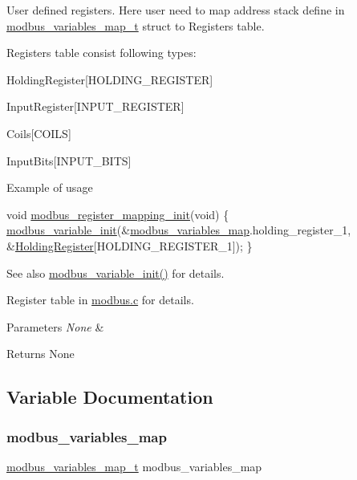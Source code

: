 User defined registers. Here user need to map address stack define in \mbox{\hyperlink{structmodbus__variables__map__t}{modbus\+\_\+variables\+\_\+map\+\_\+t}} struct to Registers table. 

Registers table consist following types\+:
\begin{DoxyItemize}
\item Holding\+Register\mbox{[}H\+O\+L\+D\+I\+N\+G\+\_\+\+R\+E\+G\+I\+S\+T\+ER\mbox{]}
\item Input\+Register\mbox{[}I\+N\+P\+U\+T\+\_\+\+R\+E\+G\+I\+S\+T\+ER\mbox{]}
\item Coils\mbox{[}C\+O\+I\+LS\mbox{]}
\item Input\+Bits\mbox{[}I\+N\+P\+U\+T\+\_\+\+B\+I\+TS\mbox{]}
\end{DoxyItemize}

Example of usage 
\begin{DoxyCode}
\textcolor{keywordtype}{void} \mbox{\hyperlink{group___insert_ga6dbaaf108ca00d5dfd1037aadfc10f6f}{modbus\_register\_mapping\_init}}(\textcolor{keywordtype}{void})
\{
    \mbox{\hyperlink{modbus__variable_8c_a84e7ba59e61fd5fee9349449df87739a}{modbus\_variable\_init}}(&\mbox{\hyperlink{group___insert_gac4b2611d22ec97dbb04b0df3b535bd7b}{modbus\_variables\_map}}.holding\_register\_1, 
      &\mbox{\hyperlink{modbus_8c_aa49e3fbdb0dcc0c28c8a1682816b6d6e}{HoldingRegister}}[HOLDING\_REGISTER\_1]);
\}
\end{DoxyCode}


\begin{DoxySeeAlso}{See also}
\mbox{\hyperlink{modbus__variable_8c_a84e7ba59e61fd5fee9349449df87739a}{modbus\+\_\+variable\+\_\+init()}} for details. 

Register table in \mbox{\hyperlink{modbus_8c}{modbus.\+c}} for details.
\end{DoxySeeAlso}

\begin{DoxyParams}{Parameters}
{\em None} & \\
\hline
\end{DoxyParams}
\begin{DoxyReturn}{Returns}
None 
\end{DoxyReturn}


\subsection{Variable Documentation}
\mbox{\label{group___insert_gac4b2611d22ec97dbb04b0df3b535bd7b}} 
\subsubsection{\texorpdfstring{modbus\+\_\+variables\+\_\+map}{modbus\_variables\_map}}
{\footnotesize\ttfamily \mbox{\hyperlink{structmodbus__variables__map__t}{modbus\+\_\+variables\+\_\+map\+\_\+t}} modbus\+\_\+variables\+\_\+map}

